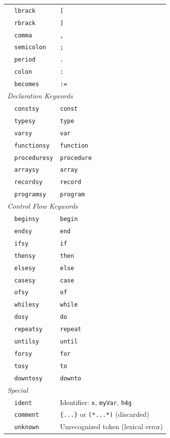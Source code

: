 \documentclass[11pt,a4paper]{article}
\begin{document}
\begin{table}[H]
{\begin{tabular}{l l p{8.5cm}}
 & \texttt{lbrack}    & \texttt{[} \\
 & \texttt{rbrack}    & \texttt{]} \\
 & \texttt{comma}     & \texttt{,} \\
 & \texttt{semicolon} & \texttt{;} \\
 & \texttt{period}    & \texttt{.} \\
 & \texttt{colon}     & \texttt{:} \\
 & \texttt{becomes}   & \texttt{:=} \\
\midrule
\multicolumn{3}{l}{\textit{Declaration Keywords}} \\[2pt]
 & \texttt{constsy}     & \texttt{const} \\
 & \texttt{typesy}      & \texttt{type} \\
 & \texttt{varsy}       & \texttt{var} \\
 & \texttt{functionsy}  & \texttt{function} \\
 & \texttt{proceduresy} & \texttt{procedure} \\
 & \texttt{arraysy}     & \texttt{array} \\
 & \texttt{recordsy}    & \texttt{record} \\
 & \texttt{programsy}   & \texttt{program} \\
\midrule
\multicolumn{3}{l}{\textit{Control Flow Keywords}} \\[2pt]
 & \texttt{beginsy}  & \texttt{begin} \\
 & \texttt{endsy}    & \texttt{end} \\
 & \texttt{ifsy}     & \texttt{if} \\
 & \texttt{thensy}   & \texttt{then} \\
 & \texttt{elsesy}   & \texttt{else} \\
 & \texttt{casesy}   & \texttt{case} \\
 & \texttt{ofsy}     & \texttt{of} \\
 & \texttt{whilesy}  & \texttt{while} \\
 & \texttt{dosy}     & \texttt{do} \\
 & \texttt{repeatsy} & \texttt{repeat} \\
 & \texttt{untilsy}  & \texttt{until} \\
 & \texttt{forsy}    & \texttt{for} \\
 & \texttt{tosy}     & \texttt{to} \\
 & \texttt{downtosy} & \texttt{downto} \\
\midrule
\multicolumn{3}{l}{\textit{Special}} \\[2pt]
 & \texttt{ident}   & Identifier: \texttt{x}, \texttt{myVar}, \texttt{h4g} \\
 & \texttt{comment} & \texttt{\{...\}} or \texttt{(*...*)} (discarded) \\
 & \texttt{unknown} & Unrecognized token (lexical error) \\
\bottomrule
\end{tabular}%
}
\end{table}
\renewcommand{\arraystretch}{1.15}
\end{document}

